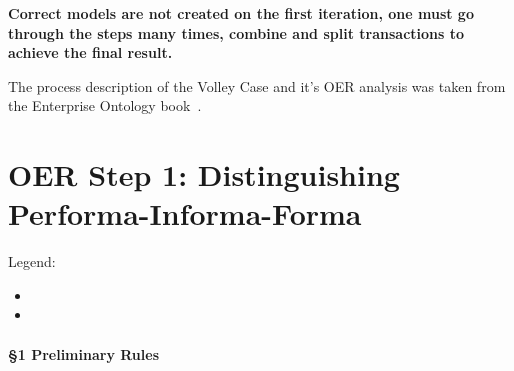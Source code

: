 \textbf{Correct models are not created on the first iteration, one must go through the steps many times, combine and split transactions to achieve the final result. }

The process description of the Volley Case and it's OER analysis was taken from the Enterprise Ontology book~\cite{dietz2020enterprise}. 

\section{OER Step 1: Distinguishing Performa-Informa-Forma}

Legend: 
\begin{itemize}
    \item {}
    \item {}
\end{itemize}

\paragraph{\S 1 Preliminary Rules}

